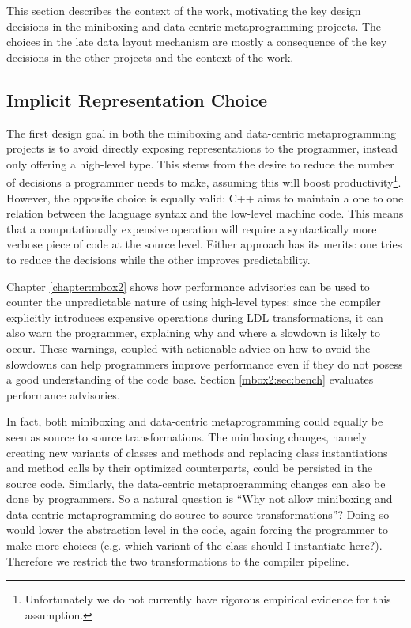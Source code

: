 This section describes the context of the work, motivating the key design decisions in the miniboxing and data-centric metaprogramming projects. The choices in the late data layout mechanism are mostly a consequence of the key decisions in the other projects and the context of the work.

\subsection{Implicit Representation Choice}

The first design goal in both the miniboxing and data-centric metaprogramming projects is to avoid directly exposing representations to the programmer, instead only offering a high-level type. This stems from the desire to reduce the number of decisions a programmer needs to make, assuming this will boost productivity\footnote{Unfortunately we do not currently have rigorous empirical evidence for this assumption.}. However, the opposite choice is equally valid: C++ aims to maintain a one to one relation between the language syntax and the low-level machine code. This means that a computationally expensive operation will require a syntactically more verbose piece of code at the source level. Either approach has its merits: one tries to reduce the decisions while the other improves predictability.

Chapter \ref{chapter:mbox2} shows how performance advisories can be used to counter the unpredictable nature of using high-level types: since the compiler explicitly introduces expensive operations during LDL transformations, it can also warn the programmer, explaining why and where a slowdown is likely to occur. These warnings, coupled with actionable advice on how to avoid the slowdowns can help programmers improve performance even if they do not posess a good understanding of the code base. Section \ref{mbox2:sec:bench} evaluates performance advisories.

In fact, both miniboxing and data-centric metaprogramming could equally be seen as source to source transformations. The miniboxing changes, namely creating new variants of classes and methods and replacing class instantiations and method calls by their optimized counterparts, could be persisted in the source code. Similarly, the data-centric metaprogramming changes can also be done by programmers. So a natural question is ``Why not allow miniboxing and data-centric metaprogramming do source to source transformations''? Doing so would lower the abstraction level in the code, again forcing the programmer to make more choices (e.g. which variant of the class should I instantiate here?). Therefore we restrict the two transformations to the compiler pipeline.


